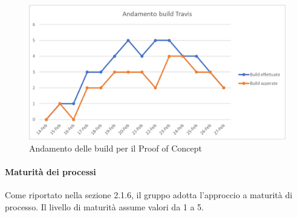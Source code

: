 \begin{figure} [H]
	\centering
	\includegraphics[scale=0.8]{Img/travis}
	\caption{Andamento delle build per il Proof of Concept}\label{}
\end{figure}

\paragraph{Maturità dei processi} \Spazio
Come riportato nella sezione 2.1.6, il gruppo adotta l'approccio a maturità di processo. Il livello di maturità assume valori da 1 a 5.

